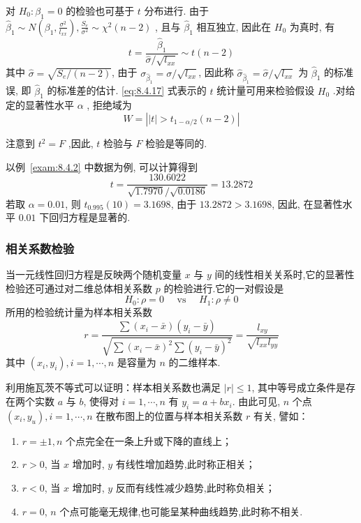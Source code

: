 对 $H_0: \beta_1=0$ 的检验也可基于 $t$ 分布进行. 由于 $\hat{\beta}_{1} \sim N \left(\beta_{1}, \frac{\sigma^{2}}{l_{x x}}\right), \frac{S_{e}}{\sigma^{2}} \sim \chi^{2}(n-2)$ , 且与 $\hat{\beta}_1$ 相互独立, 因此在 $H_0$ 为真时, 有
\begin{equation}\label{eq:8.4.17}
t=\frac{\hat{\beta}_{1}}{\hat{\sigma} / \sqrt{l_{x x}}} \sim t(n-2)
\end{equation}
其中 $\hat{\sigma} =\sqrt{S_{e}/(n-2)}$, 由于 $\sigma_{\hat{\beta}_1}=\sigma/\sqrt{l_{xx}}$, 因此称 $\hat{\sigma}_{\hat{\beta}_1}=\hat{\sigma}/\sqrt{l_{xx}} $ 为 $\hat{\beta}_1$ 的标准误, 即 $\hat{\beta}_1$ 的标准差的估计. \eqref{eq:8.4.17} 式表示的 $t$ 统计量可用来检验假设 $H_0$ .对给定的显著性水平 $\alpha$ , 拒绝域为
\begin{equation*}
W= \left| |t| > t_{1-\alpha/2} (n-2) \right|
\end{equation*}

注意到 $t^2=F$ ,因此, $t$ 检验与 $F$ 检验是等同的.

以例~\ref{exam:8.4.2} 中数据为例, 可以计算得到
\begin{equation*}
t=\frac{130.6022}{\sqrt{1.7970} / \sqrt{0.0186}}=13.2872
\end{equation*}
若取 $\alpha=0.01$, 则 $t_{0.995}(10)=3.1698$, 由于 $13.2872>3.1698$, 因此, 在显著性水平 $0.01$ 下回归方程是显著的.

\subsubsection{相关系数检验}

当一元线性回归方程是反映两个随机变量 $x$ 与 $y$ 间的线性相关关系时,它的显著性检验还可通过对二维总体相关系数 $p$ 的检验进行.它的一对假设是
\begin{equation}\label{eq:8.4.18}
H_{0} : \rho=0 \quad \text { vs } \quad H_{1} : \rho \neq 0
\end{equation}
所用的检验统计量为样本相关系数
\begin{equation}\label{eq:8.4.19}
r=\frac{\sum\left(x_{i}-\bar{x}\right)\left(y_{i}-\bar{y}\right)}{\sqrt{\sum\left(x_{i}-\bar{x}\right)^{2}\sum\left(y_{i}-\bar{y}\right)^{2}}}=\frac{l_{x y}}{\sqrt{l_{x x} l_{y y}}}
\end{equation}
其中 $(x_i,y_i), i=1, \cdots, n$ 是容量为 $n$ 的二维样本.

利用施瓦茨不等式可以证明：样本相关系数也满足  $\left| r \right|\le 1$, 其中等号成立条件是存在两个实数 $a$ 与 $b$, 使得对 $i=1,\cdots, n$ 有 $y_i = a + b x_i$. 由此可见, $n$ 个点 $(x_{i}, y_{u}), i=1, \cdots, n$ 在散布图上的位置与样本相关系数 $r$ 有关, 譬如：
\begin{enumerate}
  \item  $r = \pm 1,n$ 个点完全在一条上升或下降的直线上；
  \item  $r > 0$, 当 $x$ 增加时, $y$ 有线性增加趋势,此时称正相关；
  \item  $r < 0$, 当 $x$ 增加时, $y$ 反而有线性减少趋势,此时称负相关；
  \item  $r = 0$, $n$ 个点可能毫无规律,也可能呈某种曲线趋势,此时称不相关.
\end{enumerate}

